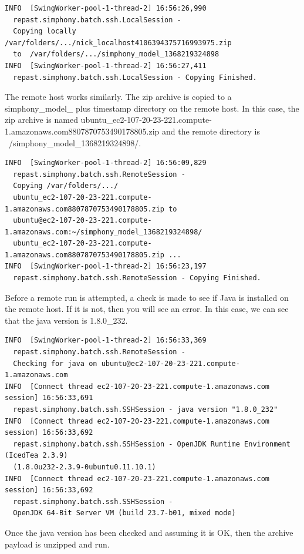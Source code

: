 \documentclass[11pt]{amsart}
\begin{document}
\begin{verbatim}
INFO  [SwingWorker-pool-1-thread-2] 16:56:26,990
  repast.simphony.batch.ssh.LocalSession -
  Copying locally /var/folders/.../nick_localhost4106394375716993975.zip
  to  /var/folders/.../simphony_model_1368219324898
INFO  [SwingWorker-pool-1-thread-2] 16:56:27,411
  repast.simphony.batch.ssh.LocalSession - Copying Finished.
\end{verbatim}

The remote host works similarly. The zip archive is copied to a simphony\_model\_ plus timestamp directory on the remote host. In this case, the zip archive is named  ubuntu\_ec2-107-20-23-221.compute-1.amazonaws.com8807870753490178805.zip and the remote directory is ~/simphony\_model\_1368219324898/.

\begin{verbatim}
INFO  [SwingWorker-pool-1-thread-2] 16:56:09,829
  repast.simphony.batch.ssh.RemoteSession -
  Copying /var/folders/.../
  ubuntu_ec2-107-20-23-221.compute-1.amazonaws.com8807870753490178805.zip to
  ubuntu@ec2-107-20-23-221.compute-1.amazonaws.com:~/simphony_model_1368219324898/
  ubuntu_ec2-107-20-23-221.compute-1.amazonaws.com8807870753490178805.zip ...
INFO  [SwingWorker-pool-1-thread-2] 16:56:23,197
  repast.simphony.batch.ssh.RemoteSession - Copying Finished.
\end{verbatim}

Before a remote run is attempted, a check is made to see if Java is installed on the remote host. If it is not, then you will see an error. In this case, we can see that the java version is 1.8.0\_232.

\begin{verbatim}
INFO  [SwingWorker-pool-1-thread-2] 16:56:33,369
  repast.simphony.batch.ssh.RemoteSession -
  Checking for java on ubuntu@ec2-107-20-23-221.compute-1.amazonaws.com
INFO  [Connect thread ec2-107-20-23-221.compute-1.amazonaws.com session] 16:56:33,691
  repast.simphony.batch.ssh.SSHSession - java version "1.8.0_232"
INFO  [Connect thread ec2-107-20-23-221.compute-1.amazonaws.com session] 16:56:33,692
  repast.simphony.batch.ssh.SSHSession - OpenJDK Runtime Environment (IcedTea 2.3.9)
  (1.8.0u232-2.3.9-0ubuntu0.11.10.1)
INFO  [Connect thread ec2-107-20-23-221.compute-1.amazonaws.com session] 16:56:33,692
  repast.simphony.batch.ssh.SSHSession -
  OpenJDK 64-Bit Server VM (build 23.7-b01, mixed mode)
\end{verbatim}

Once the java version has been checked and assuming it is OK, then the archive payload is unzipped and run.
\end{document}
